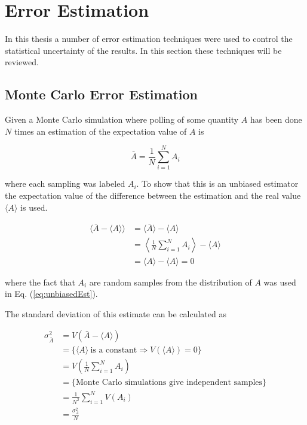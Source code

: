 \section{Error Estimation}
\label{sec:ErrorEst}

In this thesis a number of error estimation techniques were used to control the statistical uncertainty of the results. In this section these techniques will be reviewed.

\subsection{Monte Carlo Error Estimation}
\label{subsec:MonteCarloErrorEst}

Given a Monte Carlo simulation where polling of some quantity $A$ has been done $N$ times an estimation of the expectation value of $A$ is

\begin{equation}
    \bar A = \frac{1}{N} \sum_{i = 1}^{N} A_i
\end{equation}

\noindent where each sampling was labeled $A_i$. To show that this is an unbiased estimator the expectation value of the difference between the estimation and the real value $\langle A \rangle$ is used.

\begin{align}
    \langle \bar A - \langle A \rangle \rangle &= \langle \bar A \rangle - \langle A \rangle \\
%
    &= \left \langle \frac{1}{N} \sum_{i = 1}^{N} A_i \right \rangle - \langle A \rangle \\
%
    &= \langle A \rangle - \langle A \rangle = 0
    \label{eq:unbiasedEst}
\end{align}

\noindent where the fact that $A_i$ are random samples from the distribution of $A$ was used in Eq. (\ref{eq:unbiasedEst}).

The standard deviation of this estimate can be calculated as

\begin{align}
    \sigma_{\bar A}^{2} &= V\left( \bar A - \langle A \rangle \right ) \\
%
    &= \{ \langle A \rangle \ \text{is a constant} \Rightarrow V(\langle A \rangle) = 0 \} \\
%
    &= V \left ( \frac{1}{N} \sum_{i = 1}^{N} A_i \right ) \\
%
    &= \{ \text{Monte Carlo simulations give independent samples} \} \\
%
    &= \frac{1}{N^2} \sum_{i = 1}^{N} V(A_i) \\
%
    &= \frac{\sigma_{A}^2}{N}
\end{align}


